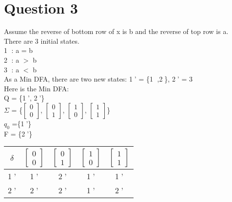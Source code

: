 \documentclass[a4paper]{article}
\begin{document}
\section{Question 3}
Assume the reverse of bottom row of x is b and the reverse of top row is a.\\
There are 3 initial states.\\
\textcircled{1} : a = b \\
\textcircled{2} : a $>$ b \\
\textcircled{3} : a $<$ b \\
As a Min DFA, there are two new states:  \textcircled{1}' = \{\textcircled{1} ,\textcircled{2}\}, \textcircled{2}' = \textcircled{3}\\
Here is the Min DFA:\\
Q = \{\textcircled{1}', \textcircled{2}'\}\\
$\Sigma$ = \{$\begin{bmatrix}0\\0\end{bmatrix}$, $\begin{bmatrix}0\\1\end{bmatrix}$, $\begin{bmatrix}1\\0\end{bmatrix}$, $\begin{bmatrix}1\\1\end{bmatrix}$\}\\
$q_{0}$ =\{\textcircled{1}'\}\\
F = \{\textcircled{2}'\}\\
\begin{tabular}{|c|c|c|c|c|}
\hline
$\delta$ & $\begin{bmatrix}0\\0\end{bmatrix}$ & $\begin{bmatrix}0\\1\end{bmatrix}$ & $\begin{bmatrix}1\\0\end{bmatrix}$ & $\begin{bmatrix}1\\1\end{bmatrix}$ \\ 
\hline
\textcircled{1}' & \textcircled{1}' & \textcircled{2}' & \textcircled{1}' & \textcircled{1}' \\
\hline 
\textcircled{2}' & \textcircled{2}' & \textcircled{2}' & \textcircled{1}' & \textcircled{2}' \\
\hline
\end{tabular}\\
\end{document}
